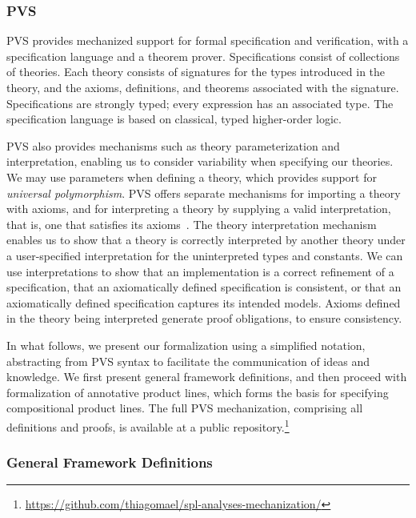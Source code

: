 \subsubsection{PVS}
PVS provides mechanized support for formal specification and verification, with a specification language and a theorem prover. Specifications consist of collections of theories. Each theory consists of signatures for the types introduced in the theory, and the axioms, definitions, and theorems associated with the signature. Specifications are strongly typed; every expression has an associated type. The specification language is based on classical, typed higher-order logic. 

PVS also provides mechanisms such as theory parameterization and interpretation, enabling us to consider variability when specifying our theories. We may use parameters when defining a theory, which provides support for \emph{universal polymorphism}. 
PVS offers separate mechanisms for importing a theory with axioms, and for interpreting a theory by supplying a valid interpretation, that is, one that satisfies its axioms~\cite{theory-interpretations-pvs}. 
The theory interpretation mechanism enables us to show that a theory is correctly interpreted by another theory under a user-specified interpretation for the uninterpreted types and constants. 
We can use interpretations to show that an implementation is a correct refinement of a specification, that an axiomatically defined specification is consistent, or that an axiomatically defined specification captures its intended models. Axioms defined in the theory being interpreted generate proof obligations, to ensure consistency. 

In what follows, we present our formalization using a simplified notation, abstracting from PVS syntax to facilitate the communication of ideas and knowledge.
We first present general framework definitions, and then proceed with formalization of annotative product lines, which forms the basis for specifying compositional product lines.
The full PVS mechanization, comprising all definitions and proofs, is available at a public repository.\footnote{\url{https://github.com/thiagomael/spl-analyses-mechanization/}}

\subsubsection{General Framework Definitions}

